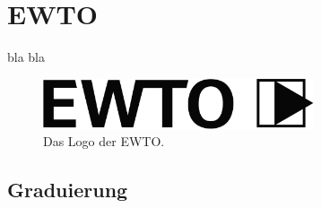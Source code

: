 
\newenvironment{WTGradSG}[1]{
	\subsection*{#1. Sch\"ulergrad}
	\texttt{[image: resources/graphics/graduierung/emblems/\#1]}
}{
}

\newenvironment{WTGradTG}[2]{
	\subsection*{#1. Techniker/Meistergrad}
	\ifthenelse{\equal{#2}{}}
	{}%
	{\texttt{[image: resources/graphics/graduierung/emblems/\#2]}}
}{
}


\renewcommand\chapterillustration{pushing_minimalistisch}
\chapter{EWTO}

bla bla

\begin{figure}[h]
	\centering
	\includegraphics[width=8cm]{resources/graphics/logos/ewto}
	\caption{Das Logo der EWTO.}
\end{figure}

\newpage

\section{Graduierung}


